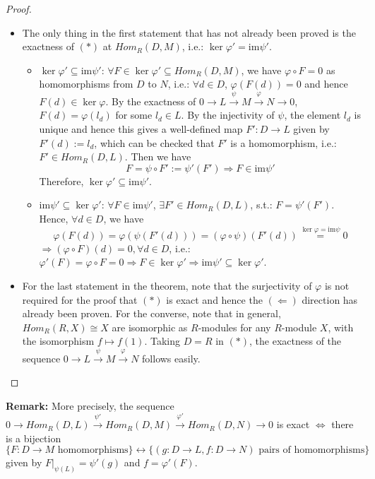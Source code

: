 \begin{proof}
    \begin{itemize}
        \item The only thing in the first statement that has not already been proved is the exactness of $(*)$ at $Hom_R(D,M)$, i.e.: $\ker \varphi' = \text{im} \psi'$.
        \begin{itemize}
            \item $\ker \varphi' \subseteq \text{im} \psi'$: $\forall F \in \ker \varphi' \subseteq Hom_R(D,M)$, we have $\varphi \circ F=0$ as homomorphisms from $D$ to $N$, i.e.: $\forall d\in D$, $\varphi (F(d))=0$ and hence $F(d) \in \ker \varphi$. By the exactness of $0 \to L \overset{\psi}{\to} M \overset{\varphi}{\to} N \to 0$, $F(d) = \varphi(l_d)$ for some $l_d\in L$. By the injectivity of $\psi$, the element $l_d$ is unique and hence this gives a well-defined map $F': D \to L$ given by $F'(d) :=l_d$, which can be checked that $F'$ is a homomorphism, i.e.: $F' \in Hom_R(D,L)$. Then we have
            $$F= \psi \circ F':= \psi'(F') \Rightarrow F\in \text{im} \psi'$$
            Therefore, $\ker \varphi' \subseteq \text{im} \psi'$.

            \item $\text{im} \psi' \subseteq \ker \varphi'$: $\forall F\in \text{im} \psi'$, $\exists F' \in Hom_R(D,L)$, s.t.: $F= \psi' (F')$. Hence, $\forall d\in D$, we have
            $$\varphi (F(d)) = \varphi (\psi (F'(d))) = (\varphi \circ \psi) (F'(d)) \overset{\ker \varphi =\text{im} \psi}{=} 0$$
            $\Rightarrow (\varphi \circ F) (d) =0, \forall d\in D$, i.e.: $\varphi' (F) = \varphi \circ F=0 \Rightarrow F\in \ker \varphi' \Rightarrow \text{im} \psi' \subseteq \ker \varphi'$.
        \end{itemize}

        \item For the last statement in the theorem, note that the surjectivity of $\varphi$ is not required for the proof that $(*)$ is exact and hence the $(\Leftarrow)$ direction has already been proven. For the converse, note that in general, $Hom_R(R,X) \cong X$ are isomorphic as $R$-modules for any $R$-module $X$, with the isomorphism $f \mapsto f(1)$. Taking $D=R$ in $(*)$, the exactness of the sequence $0 \to L \overset{\psi}{\to}M \overset{\varphi}{\to} N$ follows easily.
    \end{itemize}
\end{proof}

\noindent\textbf{Remark:} More precisely, the sequence $0 \to Hom_R(D,L) \overset{\psi'}{\to} Hom_R(D,M) \overset{\varphi'}{\to} Hom_R(D,N) \to 0$ is exact $\Leftrightarrow$ there is a bijection
\[
\{ F:D \to M \text{ homomorphisms} \} \leftrightarrow \{ (g: D \to L, f:D \to N) \text{ pairs of homomorphisms} \}
\]
given by $F|_{\psi(L)} =\psi'(g)$ and $f= \varphi' (F)$.

